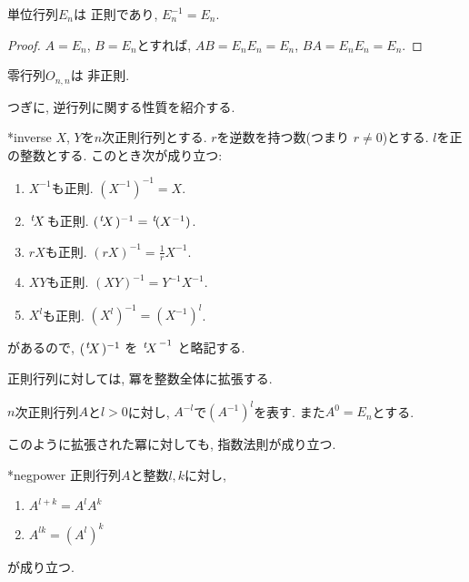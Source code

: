 \begin{example}
  単位行列$E_n$は
  正則であり,
  $E_n^{-1}=E_n$.
\end{example}
\begin{proof}
  $A=E_n$, $B=E_n$とすれば,
  $AB=E_nE_n=E_n$, $BA=E_nE_n=E_n$.
\end{proof}

\begin{example}
  零行列$O_{n,n}$は
  非正則.
\end{example}


つぎに,
逆行列に関する性質を紹介する.
\begin{proposition}
  \provelater**{inverse}
  \label{thm:inverse:operation}
  $X$, $Y$を$n$次正則行列とする.
  $r$を逆数を持つ数(つまり $r\neq 0$)とする.
  $l$を正の整数とする.
  このとき次が成り立つ:
  \begin{enumerate}
  \item{}
    $X^{-1}$も正則. $(X^{-1})^{-1}=X$.
  \item{}
    \label{prop:item:iverse-transpose}
    ${\left.^{t}\!X\right.}$も正則. $({\left.^{t}\!X\right.})^{-1}={\left.^{t}\!(X^{-1})\right.}$.
  \item{}
    $rX$も正則. $(rX)^{-1}=\frac{1}{r}X^{-1}$.
  \item{}
    $XY$も正則. $(XY)^{-1}=Y^{-1}X^{-1}$.
  \item{}
    $X^l$も正則. $(X^l)^{-1}=(X^{-1})^l$.
  \end{enumerate}
\end{proposition}

\begin{remark}
があるので,
$({\left.^{t}\!X\right.})^{-1}$
を
${\left.^{t}\!X\right.}^{-1}$
と略記する.
\end{remark}

正則行列に対しては,
冪を整数全体に拡張する.
\begin{definition}
  $n$次正則行列$A$と$l>0$に対し,
  $A^{-l}$で$(A^{-1})^l$を表す.
  また$A^{0}=E_n$とする.
\end{definition}
このように拡張された冪に対しても,
指数法則が成り立つ.
\begin{prop}
  \provelater**{negpower}
  正則行列$A$と整数$l,k$に対し,
  \begin{enumerate}
  \item{}
    $A^{l+k}=A^lA^k$
  \item{}
    $A^{lk}=(A^l)^k$
  \end{enumerate}
が成り立つ.
\end{prop}


